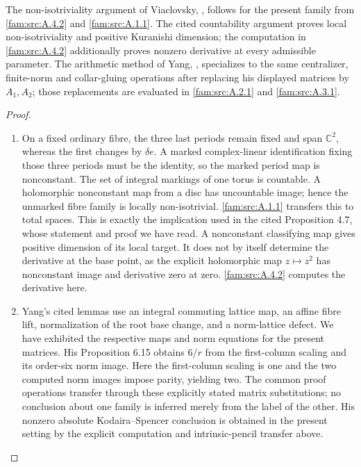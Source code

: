 \begin{proposition}\hypertarget{tag-01Q5}{}\label{fam:src:A.4.3}\label{fam:st:A.4.3}

The non-isotriviality argument of Viaclovsky, \cite[Proposition 4.7]{ViaclovskyLog2026}, follows for the present family from \ref{fam:src:A.4.2} and \ref{fam:src:A.1.1}. The cited countability argument proves local non-isotriviality and positive Kuranishi dimension; the computation in \ref{fam:src:A.4.2} additionally proves nonzero derivative at every admissible parameter. The arithmetic method of Yang, \cite[Lemmas 6.6--6.9 and Proposition 6.15]{Yang2026}, specializes to the same centralizer, finite-norm and collar-gluing operations after replacing his displayed matrices by $A_1,A_2$; those replacements are evaluated in \ref{fam:src:A.2.1} and \ref{fam:src:A.3.1}.
\end{proposition}


\begin{proof}
\begin{enumerate}[label=\arabic*.,leftmargin=*]
\item On a fixed ordinary fibre, the three last periods remain fixed and span $\mathbb C^2$, whereas the first changes by $\delta e$. A marked complex-linear identification fixing those three periods must be the identity, so the marked period map is nonconstant. The set of integral markings of one torus is countable. A holomorphic nonconstant map from a disc has uncountable image; hence the unmarked fibre family is locally non-isotrivial. \ref{fam:src:A.1.1} transfers this to total spaces. This is exactly the implication used in the cited Proposition 4.7, whose statement and proof we have read. A nonconstant classifying map gives positive dimension of its local target. It does not by itself determine the derivative at the base point, as the explicit holomorphic map $z\mapsto z^2$ has nonconstant image and derivative zero at zero. \ref{fam:src:A.4.2} computes the derivative here.

\item Yang's cited lemmas use an integral commuting lattice map, an affine fibre lift, normalization of the root base change, and a norm-lattice defect. We have exhibited the respective maps and norm equations for the present matrices. His Proposition 6.15 obtains $6/r$ from the first-column scaling and its order-six norm image. Here the first-column scaling is one and the two computed norm images impose parity, yielding two. The common proof operations transfer through these explicitly stated matrix substitutions; no conclusion about one family is inferred merely from the label of the other. His nonzero absolute Kodaira--Spencer conclusion is obtained in the present setting by the explicit computation and intrinsic-pencil transfer above.
\end{enumerate}
\end{proof}
